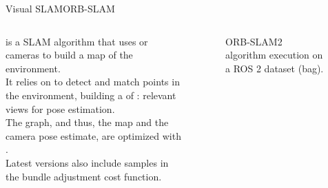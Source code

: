 \begin{frame}{Visual SLAM}{ORB-SLAM}
  \begin{columns}
     is a  SLAM algorithm that uses  or  cameras to build a map of the environment.\\
    \medskip
    It relies on  to detect and match points in the environment, building a  of : relevant views for pose estimation.\\
    \medskip
    The graph, and thus, the map and the camera pose estimate, are optimized with .\\
    \medskip
    Latest versions also include  samples in the bundle adjustment cost function.

		\begin{figure}
			\centering
			\caption{ORB-SLAM2 algorithm execution on a ROS 2 dataset (bag).}
			\label{vid:building}
		\end{figure}
  \end{columns}
\end{frame}
